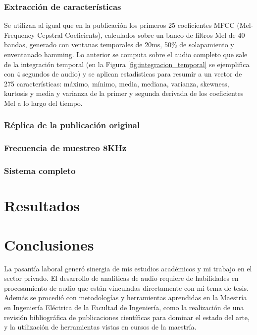 \documentclass{article}
\begin{document}
\subsubsection*{Extracción de características}
Se utilizan al igual que en la publicación \cite{Salamon:UrbanSound:ACMMM:14} los primeros 25 coeficientes MFCC (Mel-Frequency Cepstral Coeficients), calculados sobre un banco de filtros Mel de 40 bandas, generado con ventanas temporales de 20ms, 50\% de solapamiento y enventanado hamming. Lo anterior se computa sobre el audio completo que sale de la integración temporal (en la Figura \ref{fig:integracion_temporal} se ejemplifica con 4 segundos de audio) y se aplican estadísticas para resumir a un vector de 275 características: máximo, mínimo, media, mediana, varianza, skewness, kurtosis y media y varianza de la primer y segunda derivada de los coeficientes Mel a lo largo del tiempo.

\subsubsection*{Réplica de la publicación original}

\subsubsection*{Frecuencia de muestreo 8KHz}

\subsubsection*{Sistema completo}


\section{Resultados}
\label{resultados}


\section{Conclusiones}
\label{concl}
La pasantía laboral generó sinergia de mis estudios académicos y mi trabajo en el sector privado. El desarrollo de analíticas de audio requiere de habilidades en procesamiento de audio que están vinculadas directamente con mi tema de tesis. Además se procedió con metodologías y herramientas aprendidas en la Maestría en Ingeniería Eléctrica de la Facultad de Ingeniería, como la realización de una revisión bibliográfica de publicaciones científicas para dominar el estado del arte, y la utilización de herramientas vistas en cursos de la maestría.
\smallskip
\end{document}
